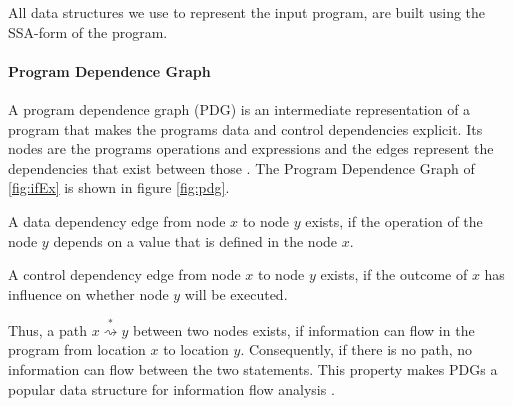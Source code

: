 All data structures we use to represent the input program, are built using the SSA-form of the program.

\paragraph{Program Dependence Graph}
A program dependence graph (PDG) is an intermediate representation of a program that makes the programs data and control dependencies explicit. Its nodes are the programs operations and expressions and the edges represent the dependencies that exist between those \cite{ferrante84}. The Program Dependence Graph of \ref{fig:ifEx} is shown in figure \ref{fig:pdg}.

A data dependency edge from node $x$ to node $y$ exists, if the operation of the node $y$ depends on a value that is defined in the node $x$.

A control dependency edge from node $x$ to node $y$ exists, if the outcome of $x$ has influence on whether node $y$ will be executed.

Thus, a path $x \stackrel{*}{\rightsquigarrow } y$ between two nodes exists, if information can flow in the program from location $x$ to location $y$. Consequently, if there is no path, no information can flow between the two statements. This property makes PDGs a popular data structure for information flow analysis \cite{horwitz88,giffhorn12}.

